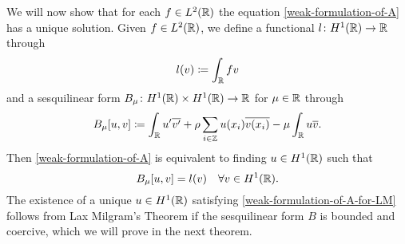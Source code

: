 We will now show that for each $f \in L^{2}(\mathbb{R})$ the equation \eqref{weak-formulation-of-A} has a unique solution. Given $f \in L^{2}(\mathbb{R})$, we define a functional $l \colon H^{1}(\mathbb{R}) \rightarrow \mathbb{R}$ through
	\[ l(v) \coloneqq \int_{\mathbb{R}} f v \]
and a sesquilinear form $B_{\mu} \colon H^{1}(\mathbb{R}) \times H^{1}(\mathbb{R}) \rightarrow \mathbb{R}$ for $\mu \in \mathbb{R}$ through
	\[ B_{\mu}[u, v] \coloneqq \int_{\mathbb{R}} u' \overline{v'} + \rho \sum_{i \in \mathbb{Z}} u(x_{i}) \overline{v(x_{i})} - \mu \int_{\mathbb{R}} u \overline{v}. \]
Then \eqref{weak-formulation-of-A} is equivalent to finding $u \in H^{1}(\mathbb{R})$ such that
	\begin{equation}
		B_{\mu}[u, v] =  l(v) \quad \forall v \in H^{1}(\mathbb{R}). \label{weak-formulation-of-A-for-LM}
	\end{equation}
The existence of a unique $u \in H^{1}(\mathbb{R})$ satisfying \eqref{weak-formulation-of-A-for-LM} follows from Lax Milgram's Theorem if the sesquilinear form $B$ is bounded and coercive, which we will prove in the next theorem.
